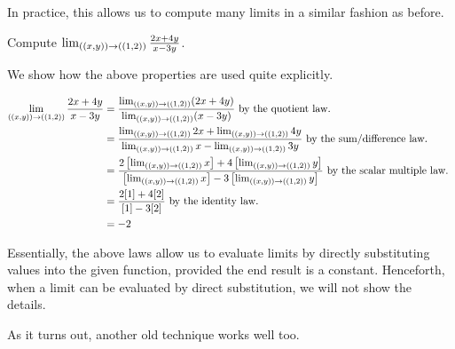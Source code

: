 \documentclass{ximera}
\begin{document}
In practice, this allows us to compute many limits in a similar fashion as before.

\begin{example}
Compute $\lim_{\left(\left(x,y\right)\right) \to \left(\left(1,2\right)\right)} \frac{2x+4y}{x-3y}$.

\begin{explanation}
We show how the above properties are used quite explicitly.

\begin{align*}
\lim_{\left(\left(x,y\right)\right) \to \left(\left(1,2\right)\right)} \frac{2x+4y}{x-3y} & = \frac{\lim_{\left(\left(x,y\right)\right) \to \left(\left(1,2\right)\right)}(2x+4y)}{\lim_{\left(\left(x,y\right)\right) \to \left(\left(1,2\right)\right)}(x-3y)} \textrm{ by the quotient law. } \\
&=  \frac{\lim_{\left(\left(x,y\right)\right) \to \left(\left(1,2\right)\right)}2x+\lim_{\left(\left(x,y\right)\right) \to \left(\left(1,2\right)\right)} 4y}{\lim_{\left(\left(x,y\right)\right) \to \left(\left(1,2\right)\right)}x-\lim_{\left(\left(x,y\right)\right) \to \left(\left(1,2\right)\right)}3y}  \textrm{ by the sum/difference law. } \\
&=  \frac{2\left[\lim_{\left(\left(x,y\right)\right) \to \left(\left(1,2\right)\right)}x\right]+4\left[\lim_{\left(\left(x,y\right)\right) \to \left(\left(1,2\right)\right)} y\right]}{\left[\lim_{\left(\left(x,y\right)\right) \to \left(\left(1,2\right)\right)}x\right]-3\left[\lim_{\left(\left(x,y\right)\right) \to \left(\left(1,2\right)\right)}y\right]}  \textrm{ by the scalar multiple law. } \\
&= \frac{2[1]+4[2]}{[1]-3[2]} \textrm{ by the identity law. } \\
&= -2
\end{align*}
\end{explanation}
\end{example}

Essentially, the above laws allow us to evaluate limits by directly substituting values into the given function, provided the end result is a constant.  Henceforth, when a limit can be evaluated by direct substitution, we will not show the details.

As it turns out, another old technique works well too.


\end{document}
